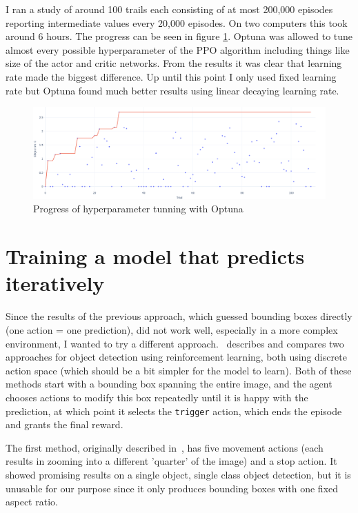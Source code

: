 \documentclass[
  digital,     %
  oneside,     %
  nosansbold,  %
  nocolorbold, %
  lof,         %
  lot,         %
]{fithesis4}
\begin{document}
I ran a study of around 100 trails each consisting of at most 200,000 episodes reporting intermediate values every 20,000 episodes. On two computers this took around 6 hours. The progress can be seen in figure \ref{fig:optuna-progress}. Optuna was allowed to tune almost every possible hyperparameter of the PPO algorithm including things like size of the actor and critic networks. From the results it was clear that learning rate made the biggest difference. Up until this point I only used fixed learning rate but Optuna found much better results using linear decaying learning rate.

\begin{figure}
    \centering
    \includegraphics[width=1\linewidth]{diagrams/optuna_progress.png}
    \caption{Progress of hyperparameter tunning with Optuna}
    \label{fig:optuna-progress}
\end{figure}

\chapter{Training a model that predicts iteratively}
\label{ch:iterative}

Since the results of the previous approach, which guessed bounding boxes directly (one action = one prediction), did not work well, especially in a more complex environment, I wanted to try a different approach.~\cite{rl_object_detection} describes and compares two approaches for object detection using reinforcement learning, both using discrete action space (which should be a bit simpler for the model to learn). Both of these methods start with a bounding box spanning the entire image, and the agent chooses actions to modify this box repeatedly until it is happy with the prediction, at which point it selects the \texttt{trigger} action, which ends the episode and grants the final reward.

The first method, originally described in~\cite{hierarchical_od_with_drl}, has five movement actions (each results in zooming into a different 'quarter' of the image) and a stop action. It showed promising results on a single object, single class object detection, but it is unusable for our purpose since it only produces bounding boxes with one fixed aspect ratio.
\end{document}
